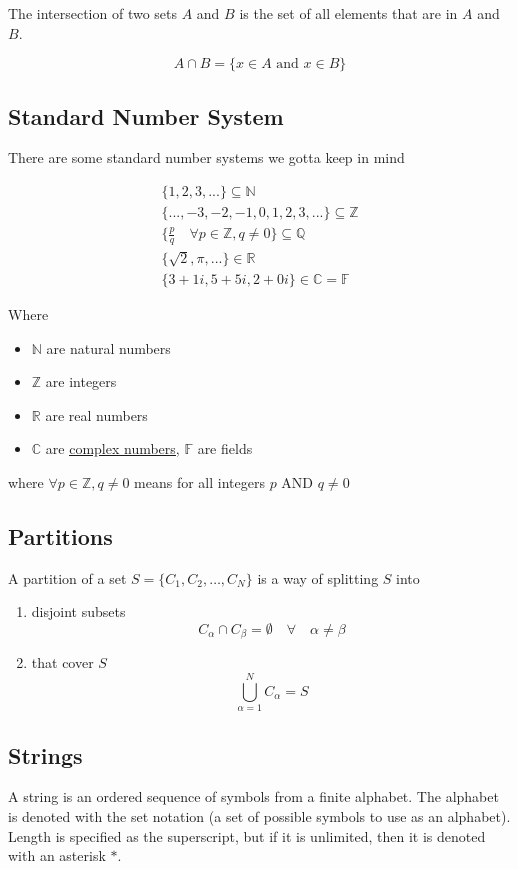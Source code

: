 \documentclass[
]{article}
\providecommand{\tightlist}{%
  \setlength{\itemsep}{0pt}\setlength{\parskip}{0pt}}
\let\oldhyperref\hyperref
\renewcommand{\hyperref}[2][]{\oldhyperref[#1]{\underline{#2}}}
\begin{document}
The intersection of two sets \(A\) and \(B\) is the set of all elements that are in \(A\) and \(B\).

\[
	A\cap B=\{x\in A \text{ and } x\in B\}
\]

\subsection{Standard Number System}\label{standard-number-systems}

There are some standard number systems we gotta keep in mind

\begin{gather*}
	\{1,2,3,...\}\subseteq\mathbb{N}\\
	\{...,-3,-2,-1,0,1,2,3,...\}\subseteq\mathbb{Z}\\
	\{\frac{p}{q}\quad\forall p\in \mathbb{Z},q\neq 0 \}\subseteq\mathbb{Q}\\
	\{\sqrt{2},\pi,...\}\in \mathbb{R}\\
	\{3+1i, 5+5i, 2+0i\}\in\mathbb{C}=\mathbb{F}
\end{gather*}

Where

\begin{itemize}
	\tightlist
	\item
	      \(\mathbb{N}\) are natural numbers
	\item
	      \(\mathbb{Z}\) are integers
	\item
	      \(\mathbb{R}\) are real numbers
	\item
	      \(\mathbb{C}\) are \hyperref[complex-numbers]{complex numbers}, \(\mathbb{F}\) are fields
\end{itemize}

where \(\forall p\in \mathbb{Z},q\neq 0\) means for all integers \(p\)
AND \(q\neq 0\)

\subsection{Partitions}\label{partitions}
A partition of a set \(S=\{C_1,C_2,…,C_N\}\) is a way of splitting \(S\) into
\begin{enumerate}
	\item
	      disjoint subsets
	      \[
		      C_\alpha  \cap C_\beta = \emptyset \quad \forall \quad \alpha \neq \beta
	      \]
	\item
	      that cover \(S\)
	      \[
		      \bigcup_{\alpha=1}^N C_\alpha = S
	      \]
\end{enumerate}
\subsection{Strings}\label{strings}
A string is an ordered sequence of symbols from a finite alphabet. The alphabet is denoted with the set notation (a set of possible symbols to use as an alphabet). Length is specified as the superscript, but if it is unlimited, then it is denoted with an asterisk $*$.
\end{document}

